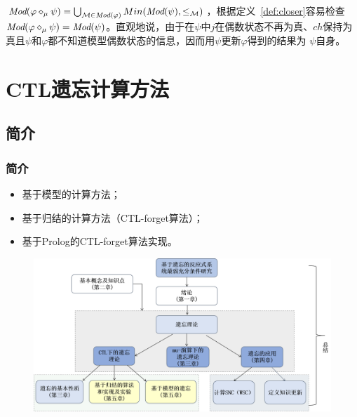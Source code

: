 \documentclass[9pt, CJK]{beamer}
\begin{document}
\begin{frame}
{\begin{example}
				$\textit{Mod}(\varphi \diamond_{\mu} \psi) = \bigcup_{{\cal M}\in \textit{Mod}(\varphi)} Min(\textit{Mod}(\psi), \leq_{{\cal M}})$，根据定义~\ref{def:closer}容易检查$\textit{Mod}(\varphi \diamond_{\mu} \psi) = \textit{Mod}(\psi)$。直观地说，由于在$\psi$中$j$在偶数状态不再为真、$ch$保持为真且$\psi$和$\varphi$都不知道模型偶数状态的信息，因而用$\psi$更新$\varphi$得到的结果为 $\psi$自身。 
			\end{example}
		}
	\end{frame}
	
	\section{CTL遗忘计算方法}
	\subsection{简介}
	\begin{frame}
		\frametitle{简介}
		\begin{itemize}
			\item 基于模型的计算方法；
			\item 基于归结的计算方法（CTL-forget算法）；
			\item 基于Prolog的CTL-forget算法实现。
		\end{itemize}
		\begin{figure}
			\includegraphics[scale=0.3]{figures/frameF5}
		\end{figure}
	\end{frame}
	
\end{document}
